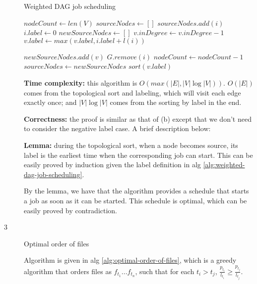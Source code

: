 \documentclass{article}
\begin{document}
\begin{description}
  \begin{algorithm}[h]
  \caption{Weighted DAG job scheduling}
  \label{alg:weighted-dag-job-scheduling}
    \begin{algorithmic}[1]
  
      \State $nodeCount \gets len(V)$
      \State $sourceNodes \gets []$
          \State $sourceNodes.add(i)$
          \State $i.label \gets 0$
        \EndIf
      \EndFor
        \State $newSourceNodes \gets []$
            \State $v.inDegree \gets v.inDegree - 1$
            \State $v.label \gets max(v.label, i.label + l(i))$
            
              \State $newSourceNodes.add(v)$
            \EndIf
          \EndFor
          \State $G.remove(i)$
          \State $nodeCount \gets nodeCount - 1$
        \EndFor
        \State $sourceNodes \gets newSourceNodes$
      \EndWhile
      \State \Return $sort(v.label)$
    \EndFunction
    
    \end{algorithmic}
  \end{algorithm}

  \textbf{Time complexity:} this algorithm is $O(max(|E|, |V| \log |V|))$. $O(|E|)$ comes from the topological sort and labeling, which will visit each edge exactly once; and $|V| \log |V|$ comes from the sorting by label in the end.

  \textbf{Correctness:} the proof is similar as that of (b) except that we don't need to consider the negative label case. A brief description below:

  \textbf{Lemma:} during the topological sort, when a node becomes source, its label is the earliest time when the corresponding job can start. This can be easily proved by induction given the label definition in alg \ref{alg:weighted-dag-job-scheduling}.

  By the lemma, we have that the algorithm provides a schedule that starts a job as soon as it can be started. This schedule is optimal, which can be easily proved by contradiction.

\item[3]{Optimal order of files}
  
  Algorithm is given in alg \ref{alg:optimal-order-of-files}, which is a greedy algorithm that orders files as $f_{t_1}...f_{t_n}$, such that for each $t_i > t_j$, $\frac{p_{t_i}}{l_{t_i}} \geq \frac{p_{t_j}}{l_{t_j}}$.


\end{description}
\end{document}
